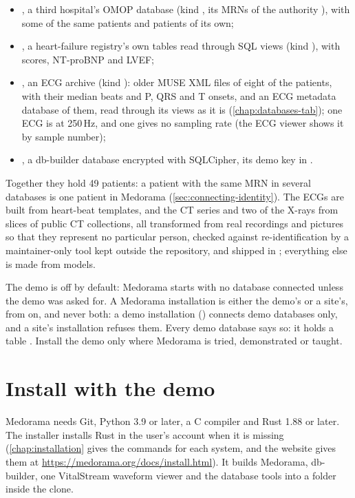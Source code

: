 \begin{itemize}
\item {}, a third hospital's OMOP database (kind , its MRNs of the
  authority ), with some of the same patients and patients of its own;
\item {}, a heart-failure registry's own tables read through SQL views (kind
  ), with scores, NT-proBNP and LVEF;
\item {}, an ECG archive (kind ): older MUSE XML files of eight of the
  patients, with their median beats and P, QRS and T onsets, and an ECG metadata database of
  them, read through its views as it is (\cref{chap:databases-tab});
  one ECG is at 250\,Hz, and one gives no sampling rate (the ECG viewer shows it by sample
  number);
\item {}, a db-builder database encrypted with SQLCipher, its demo key in
  .
\end{itemize}

Together they hold 49 patients: a patient with the same MRN in several databases is one patient
in Medorama (\cref{sec:connecting-identity}). The ECGs are built from heart-beat templates, and
the CT series and two of the X-rays from slices of public CT collections, all transformed from
real recordings and pictures so that they represent no particular person, checked against
re-identification by a maintainer-only tool kept outside the repository, and shipped in
; everything else is made from models.

\begin{note}
The demo is off by default: Medorama starts with no database connected unless the demo was asked
for. A Medorama installation is either the demo's or a site's, from  on, and
never both: a demo installation () connects demo databases only, and
a site's installation refuses them. Every demo database says so: it holds a table
. Install the demo only where Medorama is tried, demonstrated or taught.
\end{note}

\section{Install with the demo}
\label{sec:quickstart-install}

Medorama needs Git, Python 3.9 or later, a C compiler and Rust 1.88 or later. The installer
installs Rust in the user's account when it is missing (\cref{chap:installation} gives the
commands for each system, and the website gives them at
\url{https://medorama.org/docs/install.html}). It builds Medorama, db-builder, one VitalStream waveform viewer and
the database tools into a  folder inside the clone.

